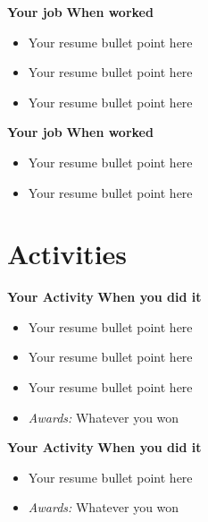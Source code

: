 \documentclass[12pt, letterpaper]{memoir}
\begin{document}
\begin{minipage}[t]{0.675\textwidth}
\textbf{Your job} \hspace*{\fill} \textbf{When worked}
\vspace{-.5\baselineskip}
\begin{itemize}[itemsep=-1mm]
	\setlength{\itemindent}{-.2in}
	\item Your resume bullet point here
	\item Your resume bullet point here
	\item Your resume bullet point here
\end{itemize}

\textbf{Your job} \hspace*{\fill} \textbf{When worked}
\vspace{-.5\baselineskip}
\begin{itemize}[itemsep=-1mm]
	\setlength{\itemindent}{-.2in}
	\item Your resume bullet point here
	\item Your resume bullet point here
\end{itemize}

\vspace{-1.5\baselineskip}
\section*{Activities}
\vspace{-.5\baselineskip}
\textbf{Your Activity} \hspace*{\fill} \textbf{When you did it}
\vspace{-.5\baselineskip}
\begin{itemize}[itemsep=-1mm]
	\item Your resume bullet point here
	\item Your resume bullet point here
	\item Your resume bullet point here
	\item \emph{Awards:} Whatever you won
\end{itemize}

\textbf{Your Activity} \hspace*{\fill} \textbf{When you did it}
\vspace{-.5\baselineskip}
\begin{itemize}[itemsep=-1mm]
	\item Your resume bullet point here
	\item \emph{Awards:} Whatever you won
\end{itemize}

\end{minipage}
\end{document}
